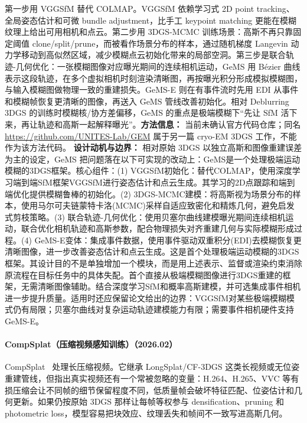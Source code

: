 第一步用 VGGSfM 替代 COLMAP。VGGSfM 依赖学习式 2D point tracking、全局姿态估计和可微 bundle adjustment，比手工 keypoint matching 更能在模糊纹理上给出可用相机和点云。第二步用 3DGS-MCMC 训练场景：高斯不再只靠固定阈值 clone/split/prune，而被看作场景分布的样本，通过随机梯度 Langevin 动力学移动到高似然区域，减少模糊点云初始化带来的局部空洞。第三步是联合轨迹-几何优化：一张模糊图像对应曝光期间的连续相机运动，GeMS 用 Bézier 曲线表示这段轨迹，在多个虚拟相机时刻渲染清晰图，再按曝光积分形成模拟模糊图，与输入模糊图做物理一致的重建损失。GeMS-E 则在有事件流时先用 EDI 从事件和模糊帧恢复更清晰的图像，再送入 GeMS 管线改善初始化。相对 Deblurring 3DGS 的训练时模糊核/协方差偏移，GeMS 的重点是极端模糊下“先让 SfM 活下来，再让轨迹和高斯一起解释曝光”。\textbf{方法信息：} 当前未确认官方代码仓库；同名 \url{https://github.com/UNITES-Lab/GEM} 属于另一篇 cryo-EM 3DGS 工作，不能作为该方法代码。
\textbf{设计动机与边界：} 相对原始 3DGS 以独立高斯和图像重建误差为主的设定，GeMS 把问题落在以下可实现的改动上：GeMS是一个处理极端运动模糊的3DGS框架。核心组件：(1) VGGSfM初始化：替代COLMAP，使用深度学习端到端SfM框架VGGSfM进行姿态估计和点云生成。其学习的2D点跟踪和端到端优化提供模糊鲁棒的初始化。(2) 3DGS-MCMC建模：将高斯视为场景分布的样本，使用马尔可夫链蒙特卡洛(MCMC)采样自适应致密化和精炼几何，避免启发式剪枝策略。(3) 联合轨迹-几何优化：使用贝塞尔曲线建模曝光期间连续相机运动，联合优化相机轨迹和高斯参数，配合物理损失对齐重建几何与实际模糊形成过程。(4) GeMS-E变体：集成事件数据，使用事件驱动双重积分(EDI)去模糊恢复更清晰图像，进一步改善姿态估计和点云生成。这是首个处理极端运动模糊的3DGS框架。其设计目的不是单独增加一个模块，而是用上述表示、监督或渲染约束消除原流程在目标任务中的具体失配。首个直接从极端模糊图像进行3DGS重建的框架，无需清晰图像辅助。结合深度学习SfM和概率高斯建模，并可选集成事件相机进一步提升质量。适用时还应保留论文给出的边界：VGGSfM对某些极端模糊模式仍有局限；贝塞尔曲线对复杂运动轨迹建模能力有限；需要事件相机硬件支持GeMS-E。
\paragraph{CompSplat（压缩视频感知训练）（2026.02）}
CompSplat~\cite{2602_09816} 处理长压缩视频。它继承 LongSplat/CF-3DGS 这类长视频或无位姿重建管线，但指出真实视频还有一个常被忽略的变量：H.264、H.265、VVC 等有损压缩会让不同帧的细节保留程度不同，低质量帧会破坏特征匹配、位姿估计和几何更新。如果仍按原始 3DGS 那样让每帧等权参与 densification、pruning 和 photometric loss，模型容易把块效应、纹理丢失和帧间不一致写进高斯几何。

